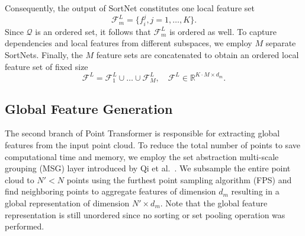 \documentclass{ieeeaccess}
\begin{document}
Consequently, the output of SortNet constitutes one local feature set
\begin{equation}
\mathcal{F}_{m}^L = \{ f_{i}^j, j = 1,\dots, K \}.    
\end{equation}
Since $\mathcal{Q}$ is an ordered set, it follows that $\mathcal{F}_{m}^{L}$ is ordered as well.
To capture dependencies and local features from different subspaces, we employ $M$ separate SortNets. Finally, the $M$ feature sets are concatenated to obtain an ordered local feature set of fixed size
\begin{equation}
    \mathcal{F}^{L} = \mathcal{F}_{1}^L \cup \dotsc \cup \mathcal{F}_{M}^L,\quad \mathcal{F}^{L}  \in \mathbb{R}^{K\cdot M\times d_{m}}.
\end{equation}

\subsection{Global Feature Generation}
The second branch of Point Transformer is responsible for extracting global features from the input point cloud. 
To reduce the total number of points to save computational time and memory, we employ the set abstraction multi-scale grouping (MSG) layer introduced by Qi et al.~\cite{qi2017pointnet++}. We subsample the entire point cloud to $N' < N$ points using the furthest point sampling algorithm (FPS) and find neighboring points to aggregate features of dimension $d_m$ resulting in a global representation of dimension $N' \times d_{m}$. 
Note that the global feature representation is still unordered since no sorting or set pooling operation was performed. 
\end{document}
